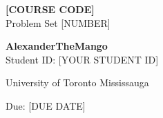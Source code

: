 
\begin{titlepage}
    \null
    \vfill
    \begin{center}

        {\fontsize{40}{48}\selectfont \bfseries [COURSE CODE]}
        \vspace{10pt} \\

        {\LARGE Problem Set [NUMBER]} \\
        \vspace{15pt}

        {\large \textbf{AlexanderTheMango}} \\
        \vspace{5pt}
        {\normalsize Student ID: [YOUR STUDENT ID]} \\
        \vspace{10pt}

        {\normalsize University of Toronto Mississauga} \\
        \vspace{5pt}

        {\normalsize Due: [DUE DATE]}

    \end{center}
    \vfill
\end{titlepage}

\newpage